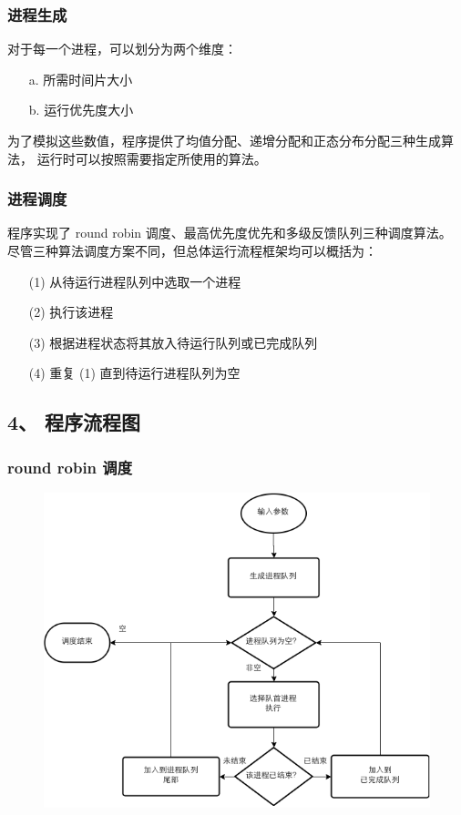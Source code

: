 \documentclass[12bp]{guo}
\begin{document}
\subsubsection{进程生成}

对于每一个进程，可以划分为两个维度：

\begin{enumerate}
    \item[a.] 所需时间片大小
    \item[b.] 运行优先度大小
\end{enumerate}


为了模拟这些数值，程序提供了均值分配、递增分配和正态分布分配三种生成算法，
运行时可以按照需要指定所使用的算法。


\subsubsection{进程调度}

程序实现了 round robin 调度、最高优先度优先和多级反馈队列三种调度算法。
尽管三种算法调度方案不同，但总体运行流程框架均可以概括为：

\begin{enumerate}
    \item[(1)] 从待运行进程队列中选取一个进程
    \item[(2)] 执行该进程
    \item[(3)] 根据进程状态将其放入待运行队列或已完成队列
    \item[(4)] 重复 (1) 直到待运行进程队列为空
\end{enumerate}


\subsection{4、 程序流程图}

\subsubsection{round robin 调度}

\begin{figure}[h!]
    \centering
        \includegraphics[scale=0.75]{figures/1.flow.rr.png}
\end{figure}
\end{document}
